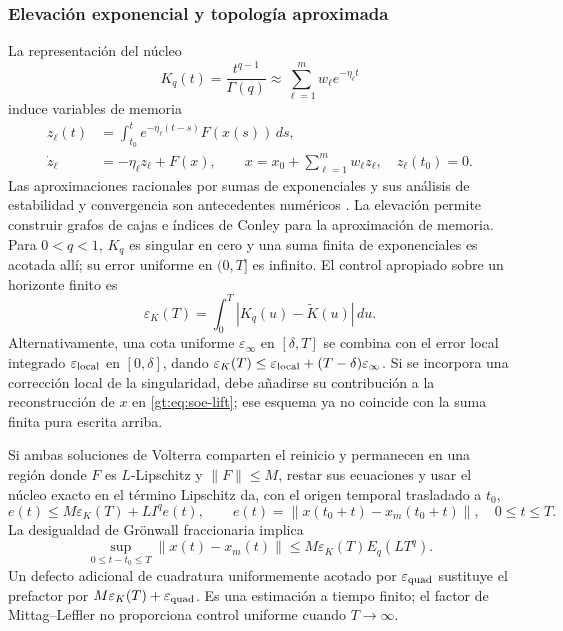 \subsubsection{Elevación exponencial y topología aproximada}

La representación del núcleo
\begin{equation}
 K_q(t)=\frac{t^{q-1}}{\Gamma(q)}
 \approx\sum_{\ell=1}^{m}w_\ell e^{-\eta_\ell t}
 \label{gt:eq:soe-kernel}
\end{equation}
induce variables de memoria
\begin{align}
 z_\ell(t)&=\int_{t_0}^{t}e^{-\eta_\ell(t-s)}F(x(s))\,ds,\\
 \dot z_\ell&=-\eta_\ell z_\ell+F(x),
 \qquad
 x=x_0+\sum_{\ell=1}^{m}w_\ell z_\ell,
 \quad z_\ell(t_0)=0.
 \label{gt:eq:soe-lift}
\end{align}
Las aproximaciones racionales por sumas de exponenciales y sus análisis de
estabilidad y convergencia son antecedentes numéricos
\cite{KhristenkoWohlmuth2023Rational}. La elevación permite construir
grafos de cajas e índices de Conley para la aproximación de memoria.
Para $0<q<1$, $K_q$ es singular en cero y una suma finita de exponenciales
es acotada allí; su error uniforme en $(0,T]$ es infinito. El control
apropiado sobre un horizonte finito es
\begin{equation}
 \varepsilon_K(T)=\int_0^T|K_q(u)-\widetilde K(u)|\,du.
 \label{gt:eq:soe-L1-kernel-error}
\end{equation}
Alternativamente, una cota uniforme $\varepsilon_\infty$ en $[\delta,T]$
se combina con el error local integrado $\varepsilon_{\rm local}$ en
$[0,\delta]$, dando
$\varepsilon_K(T)\le\varepsilon_{\rm local}+(T-\delta)\varepsilon_\infty$.
Si se incorpora una corrección local de la singularidad, debe añadirse su
contribución a la reconstrucción de $x$ en \eqref{gt:eq:soe-lift}; ese esquema
ya no coincide con la suma finita pura escrita arriba.

Si ambas soluciones de Volterra comparten el reinicio y permanecen en una
región donde $F$ es $L$-Lipschitz y $\|F\|\le M$, restar sus ecuaciones y
usar el núcleo exacto en el término Lipschitz da, con el origen temporal
trasladado a $t_0$,
\[
 e(t)\le M\varepsilon_K(T)+L I^qe(t),\qquad
 e(t)=\|x(t_0+t)-x_m(t_0+t)\|,\quad 0\le t\le T.
\]
La desigualdad de Grönwall fraccionaria implica
\begin{equation}
 \sup_{0\le t-t_0\le T}\|x(t)-x_m(t)\|
 \le M\varepsilon_K(T)E_q(LT^q).
 \label{gt:eq:soe-finite-solution-error}
\end{equation}
Un defecto adicional de cuadratura uniformemente acotado por
$\varepsilon_{\rm quad}$ sustituye el prefactor por
$M\varepsilon_K(T)+\varepsilon_{\rm quad}$. Es una estimación a tiempo
finito; el factor de Mittag--Leffler no proporciona control uniforme cuando
$T\to\infty$.

